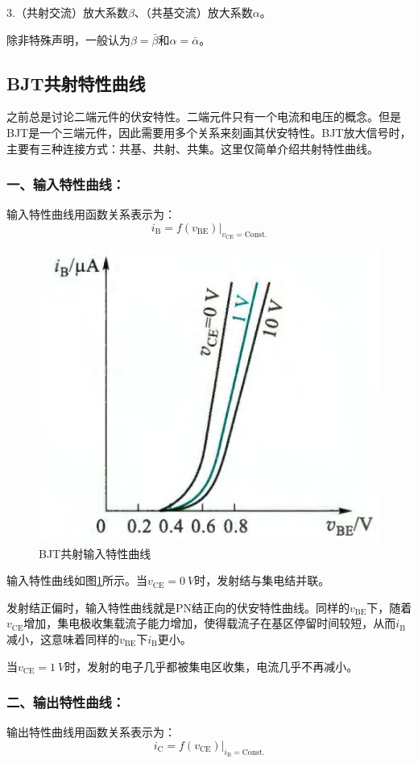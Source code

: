 3.（共射交流）放大系数$\beta$、（共基交流）放大系数$\alpha$。

除非特殊声明，一般认为$\beta=\bar{\beta}$和$\alpha=\bar{\alpha}$。

\subsection{BJT共射特性曲线}
之前总是讨论⼆端元件的伏安特性。⼆端元件只有⼀个电流和电压的概念。但是BJT是⼀个三端元件，因此需要⽤多个关系来刻画其伏安特性。BJT放大信号时，主要有三种连接方式：共基、共射、共集。这里仅简单介绍共射特性曲线。

\subsubsection{一、输入特性曲线：}
输入特性曲线用函数关系表示为：
\begin{equation}
    i_\mathrm{B}=f(v_{\mathrm{BE}})|_{v_{\mathrm{CE}}=\mathrm{Const.}}
\end{equation}

\begin{figure}[htb]
    \centering
    \includegraphics[width=0.35\linewidth]{pic/BJT共射输入特性曲线.png}
    \caption{BJT共射输入特性曲线\cite{康华光}\label{BJT共射输入特性曲线}}
\end{figure}

输入特性曲线如图\ref{BJT共射输入特性曲线}所示。当$v_{\mathrm{CE}}=\qty{0}{V}$时，发射结与集电结并联。

发射结正偏时，输入特性曲线就是PN结正向的伏安特性曲线。同样的$v_{\mathrm{BE}}$下，随着$v_{\mathrm{CE}}$增加，集电极收集载流子能力增加，使得载流子在基区停留时间较短，从而$i_\mathrm{B}$减小，这意味着同样的$v_{\mathrm{BE}}$下$i_\mathrm{B}$更小。

当$v_{\mathrm{CE}}=\qty{1}{V}$时，发射的电子几乎都被集电区收集，电流几乎不再减小。

\subsubsection{二、输出特性曲线：}
输出特性曲线用函数关系表示为：
\begin{equation}
    i_\mathrm{C}=f(v_{\mathrm{CE}})|_{i_{\mathrm{B}}=\mathrm{Const.}}
\end{equation}


